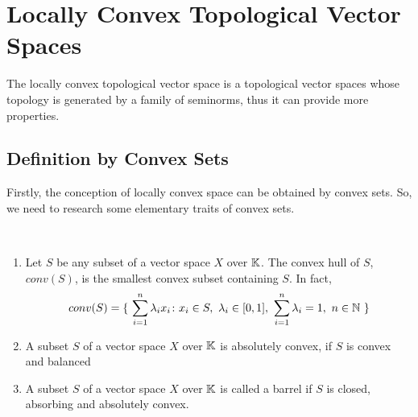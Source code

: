 \documentclass[a4paper,11pt]{report}
\begin{document}
\section{Locally Convex Topological Vector Spaces}

The locally convex topological vector space is a topological vector spaces whose topology is generated by a family of seminorms, thus it can provide more properties.

\subsection{Definition by Convex Sets}

Firstly, the conception of locally convex space can be obtained by convex sets. So, we need to research some elementary traits of convex sets.

\begin{defn}
	~
	\begin{enumerate}[label=\arabic*)]
		\item Let $S$ be any subset of a vector space $X$ over $\mathbb{K}$. The convex hull of $S$, $conv(S)$, is the smallest convex subset containing $S$. In fact, 
		\begin{equation*}
			conv(S) = \{~ \sum_{i=1}^{n}\lambda_i x_i \colon x_i \in S,~ \lambda_i \in [0,1],~ \sum_{i=1}^{n}\lambda_i = 1,~ n \in \mathbb{N} ~\}
		\end{equation*}
		\item A subset $S$ of a vector space $X$ over $\mathbb{K}$ is absolutely convex, if $S$ is convex and balanced
		\item A subset $S$ of a vector space $X$ over $\mathbb{K}$ is called a barrel if $S$ is closed, absorbing and absolutely convex.
	\end{enumerate}
\end{defn}
\end{document}
